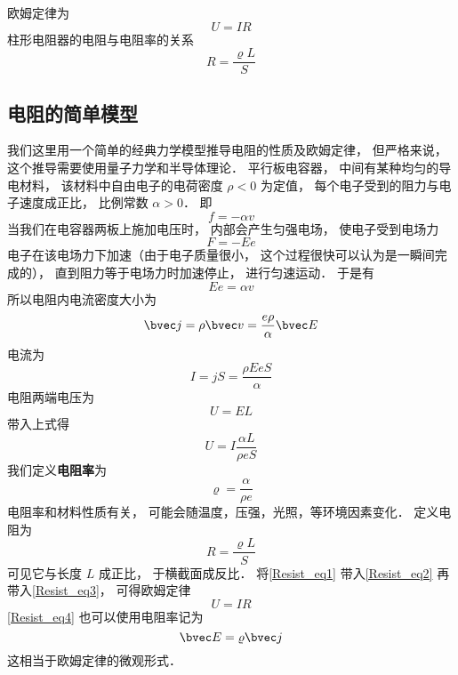 

欧姆定律为
\begin{equation}
U = IR
\end{equation}
柱形电阻器的电阻与电阻率的关系
\begin{equation}
R = \frac{\varrho L}{S}
\end{equation}


\subsection{电阻的简单模型}
我们这里用一个简单的经典力学模型推导电阻的性质及欧姆定律， 但严格来说， 这个推导需要使用量子力学和半导体理论． 平行板电容器， 中间有某种均匀的导电材料， 该材料中自由电子的电荷密度 $\rho < 0$ 为定值， 每个电子受到的阻力与电子速度成正比， 比例常数 $\alpha > 0$． 即
\begin{equation}
f = -\alpha v
\end{equation}
当我们在电容器两板上施加电压时， 内部会产生匀强电场， 使电子受到电场力
\begin{equation}
F = -Ee
\end{equation}
电子在该电场力下加速（由于电子质量很小， 这个过程很快可以认为是一瞬间完成的）， 直到阻力等于电场力时加速停止， 进行匀速运动． 于是有
\begin{equation}
Ee = \alpha v
\end{equation}
所以电阻内电流密度大小为
\begin{equation}\label{Resist_eq4}
\bvec j = \rho \bvec v = \frac{e\rho}{\alpha}\bvec E
\end{equation}
电流为
\begin{equation}
I = jS = \frac{\rho EeS}{\alpha}
\end{equation}
电阻两端电压为
\begin{equation}
U = EL
\end{equation}
带入上式得
\begin{equation}\label{Resist_eq3}
U = I \frac{\alpha L}{\rho eS}
\end{equation}
我们定义\textbf{电阻率}为
\begin{equation}\label{Resist_eq1}
\varrho = \frac{\alpha}{\rho e}
\end{equation}
电阻率和材料性质有关， 可能会随温度，压强，光照，等环境因素变化． 定义电阻为
\begin{equation}\label{Resist_eq2}
R = \frac{\varrho L}{S}
\end{equation}
可见它与长度 $L$ 成正比， 于横截面成反比． 将\autoref{Resist_eq1} 带入\autoref{Resist_eq2} 再带入\autoref{Resist_eq3}， 可得欧姆定律
\begin{equation}
U = IR
\end{equation}
\autoref{Resist_eq4} 也可以使用电阻率记为
\begin{equation}
\bvec E = \varrho\bvec j
\end{equation}
这相当于欧姆定律的微观形式．
